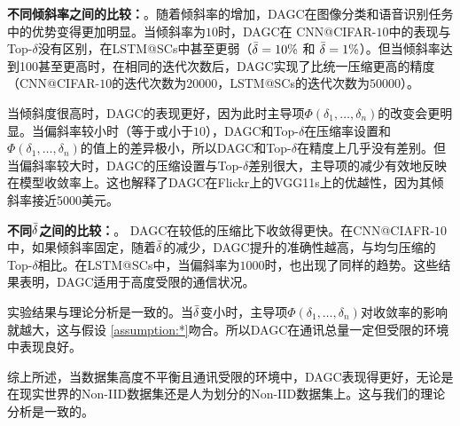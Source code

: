 \noindent\textbf{不同倾斜率之间的比较：}。随着倾斜率的增加，DAGC在图像分类和语音识别任务中的优势变得更加明显。当倾斜率为$10$时，DAGC在 CNN@CIFAR-$10$中的表现与Top-$\delta$没有区别，在LSTM@SCs中甚至更弱（$\Bar{\delta}=10\%$ 和 $\Bar{\delta}=1\%$）。但当倾斜率达到100甚至更高时，在相同的迭代次数后，DAGC实现了比统一压缩更高的精度（CNN@CIFAR-$10$的迭代次数为$20000$，LSTM@SCs的迭代次数为$50000$）。

当倾斜度很高时，DAGC的表现更好，因为此时主导项$\Phi(\delta_1,\ldots,\delta_n)$的改变会更明显。当偏斜率较小时（等于或小于$10$），DAGC和Top-$\delta$在压缩率设置和$\Phi(\delta_1,\ldots,\delta_n)$的值上的差异极小，所以DAGC和Top-$\delta$在精度上几乎没有差别。但当偏斜率较大时，DAGC的压缩设置与Top-$\delta$差别很大，主导项的减少有效地反映在模型收敛率上。这也解释了DAGC在Flickr上的VGG11s上的优越性，因为其倾斜率接近5000美元。

\noindent\textbf{不同$\Bar{\delta}$之间的比较：}。
DAGC在较低的压缩比下收敛得更快。在CNN@CIAFR-$10$中，如果倾斜率固定，随着$\Bar{\delta}$的减少，DAGC提升的准确性越高，与均匀压缩的Top-$\delta$相比。在LSTM@SCs中，当偏斜率为$1000$时，也出现了同样的趋势。这些结果表明，DAGC适用于高度受限的通信状况。

实验结果与理论分析是一致的。当$\Bar{\delta}$变小时，主导项$\Phi(\delta_1,\ldots,\delta_n)$对收敛率的影响就越大，这与假设 \ref{assumption:*}吻合。所以DAGC在通讯总量一定但受限的环境中表现良好。


综上所述，当数据集高度不平衡且通讯受限的环境中，DAGC表现得更好，无论是在现实世界的Non-IID数据集还是人为划分的Non-IID数据集上。这与我们的理论分析是一致的。
